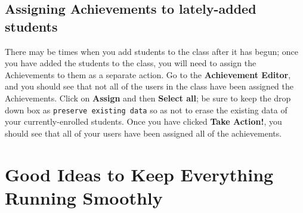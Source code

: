 \documentclass[12pt]{article}
\newcommand{\menu}[1]{\textbf{#1}}
\begin{document}
\subsection{Assigning Achievements to lately-added students}\label{achievementslateaddstudents}
There may be times when you add students to the class after it has begun; once you have added the students to the class, you will need to assign the Achievements to them as a separate action. Go to the \menu{Achievement Editor}, and you should see that not all of the users in the class have been assigned the Achievements. Click on \menu{Assign} and then \menu{Select all}; be sure to keep the drop down box as \texttt{preserve existing data} so as not to erase the existing data of your currently-enrolled students. Once you have clicked \menu{Take Action!}, you should see that all of your users have been assigned all of the achievements.


\section{Good Ideas to Keep Everything Running Smoothly}\label{goodideas}
\end{document}
